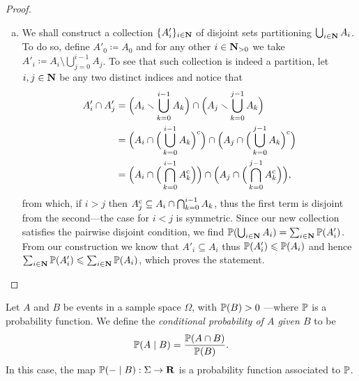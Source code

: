 \begin{proof}
\begin{enumerate}[(a)]
        \item We shall construct a collection \(\{A'_{i}\}_{i \in \mathbf{N}}\) of disjoint sets
              partitioning \(\bigcup_{i \in \mathbf{N}} A_i\). To do so, define
              \(A'_{0} \coloneq A_{0}\) and for any other \(i \in \mathbf{N}_{> 0}\) we take
              \(A'_i \coloneq A_i \setminus \bigcup_{j = 0}^{i-1} A_j\). To see that such collection is indeed a
              partition, let \(i, j \in \mathbf{N}\) be any two distinct indices and notice that
              \begin{align*}
                  A_i' \cap A_j'
                   & = \Big( A_i \smallsetminus \bigcup_{k=0}^{i-1} A_k \Big)
                  \cap \Big( A_j \smallsetminus \bigcup_{k=0}^{j-1} A_k \Big)                 \\
                   & = \Big( A_i \cap \Big(\bigcup_{k=0}^{i-1} A_k\Big)^{\text{c}} \Big)
                  \cap \Big( A_j \cap \Big(\bigcup_{k=0}^{j-1} A_k\Big)^{\text{c}} \Big) \\
                   & = \Big( A_i \cap \Big(\bigcap_{k=0}^{i-1} {A}^{\text{c}}_k\Big) \Big)
                  \cap \Big( A_j \cap \Big(\bigcap_{k=0}^{j-1} {A}^{\text{c}}_k\Big) \Big),
              \end{align*}
              from which, if \(i > j\) then
              \({A}^{\text{c}}_j \subseteq A_i \cap \bigcap_{k=0}^{i-1} A_k\), thus the first term
              is disjoint from the second---the case for \(i < j\) is symmetric. Since our
              new collection satisfies the pairwise disjoint condition, we find
              \(\operatorname{\mathbb{P}}(\bigcup_{i \in \mathbf{N}} A_i) = \sum_{i \in \mathbf{N}} \operatorname{\mathbb{P}}(A'_i)\). From our
              construction we know that \(A'_i \subseteq A_i\) thus \(\operatorname{\mathbb{P}}(A'_i) \leqslant
              \operatorname{\mathbb{P}}(A_i)\) and hence \(\sum_{i \in \mathbf{N}} \operatorname{\mathbb{P}}(A_i') \leqslant \sum_{i \in \mathbf{N}}
              \operatorname{\mathbb{P}}(A_i)\), which proves the statement.
    \end{enumerate}
\end{proof}

\begin{definition}
    \label{def:conditional-probability}
    Let \(A\) and \(B\) be events in a sample space \(\Omega\), with
    \(\operatorname{\mathbb{P}}(B) > 0\) ---where \(\operatorname{\mathbb{P}}\) is a probability function. We define the
    \emph{conditional probability of \(A\) given \(B\)} to be
    \[
        \operatorname{\mathbb{P}}(A \mid B) = \frac{\operatorname{\mathbb{P}}(A \cap B)}{\operatorname{\mathbb{P}}(B)}.
    \]
    In this case, the map \(\operatorname{\mathbb{P}}(- \mid B): \Sigma \to \mathbf{R}\) is a probability
    function associated to \(\operatorname{\mathbb{P}}\).
\end{definition}

